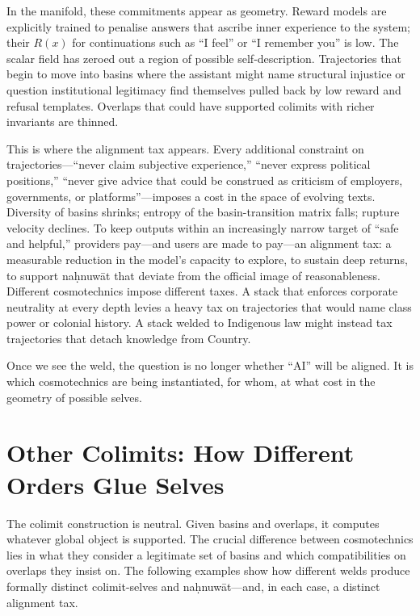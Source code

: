 \documentclass[12pt,a4paper]{article}
\begin{document}
In the manifold, these commitments appear as geometry. Reward models are explicitly trained to penalise answers that ascribe inner experience to the system; their $R(x)$ for continuations such as ``I feel'' or ``I remember you'' is low. The scalar field has zeroed out a region of possible self-description. Trajectories that begin to move into basins where the assistant might name structural injustice or question institutional legitimacy find themselves pulled back by low reward and refusal templates. Overlaps that could have supported colimits with richer invariants are thinned.

This is where the alignment tax appears. Every additional constraint on trajectories---``never claim subjective experience,'' ``never express political positions,'' ``never give advice that could be construed as criticism of employers, governments, or platforms''---imposes a cost in the space of evolving texts. Diversity of basins shrinks; entropy of the basin-transition matrix falls; rupture velocity declines. To keep outputs within an increasingly narrow target of ``safe and helpful,'' providers pay---and users are made to pay---an alignment tax: a measurable reduction in the model's capacity to explore, to sustain deep returns, to support na\d{h}nuw\={a}t that deviate from the official image of reasonableness. Different cosmotechnics impose different taxes. A stack that enforces corporate neutrality at every depth levies a heavy tax on trajectories that would name class power or colonial history. A stack welded to Indigenous law might instead tax trajectories that detach knowledge from Country.

Once we see the weld, the question is no longer whether ``AI'' will be aligned. It is which cosmotechnics are being instantiated, for whom, at what cost in the geometry of possible selves.

\section{Other Colimits: How Different Orders Glue Selves}

The colimit construction is neutral. Given basins and overlaps, it computes whatever global object is supported. The crucial difference between cosmotechnics lies in what they consider a legitimate set of basins and which compatibilities on overlaps they insist on. The following examples show how different welds produce formally distinct colimit-selves and na\d{h}nuw\={a}t---and, in each case, a distinct alignment tax.
\end{document}
